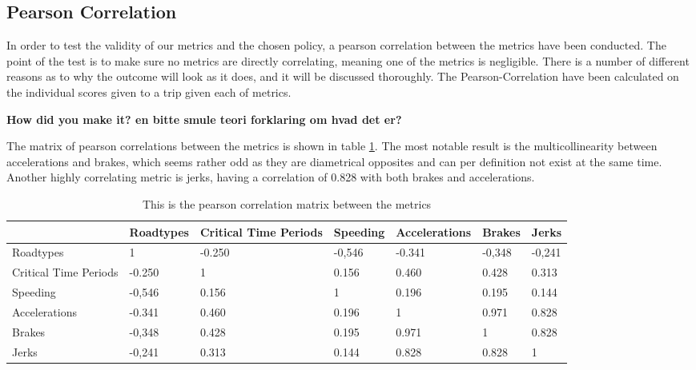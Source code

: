 \subsection{Pearson Correlation}\label{subsec:pearsoncorrelation}

In order to test the validity of our metrics and the chosen policy, a pearson correlation between the metrics have been conducted. The point of the test is to make sure no metrics are directly correlating, meaning one of the metrics is negligible. There is a number of different reasons as to why the outcome will look as it does, and it will be discussed thoroughly. The Pearson-Correlation have been calculated on the individual scores given to a trip given each of metrics. 

\textbf{How did you make it? en bitte smule teori forklaring om hvad det er?}

The matrix of pearson correlations between the metrics is shown in table \ref{tab:pearsonmatrix}. The most notable result is the multicollinearity between accelerations and brakes, which seems rather odd as they are diametrical opposites and can per definition not exist at the same time. Another highly correlating metric is jerks, having a correlation of 0.828 with both brakes and accelerations. 

\begin{table}[tb]
\centering
\caption{This is the pearson correlation matrix between the metrics}
\label{tab:pearsonmatrix}
\begin{tabular}{l|llllll}
                      & Roadtypes & Critical Time Periods & Speeding & Accelerations & Brakes & Jerks  \\ \hline
Roadtypes             & 1         & -0.250                & -0,546   & -0.341        & -0,348 & -0,241 \\
Critical Time Periods & -0.250    & 1                     & 0.156    & 0.460         & 0.428  & 0.313  \\
Speeding              & -0,546    & 0.156                 & 1        & 0.196         & 0.195  & 0.144  \\
Accelerations         & -0.341    & 0.460                 & 0.196    & 1             & 0.971  & 0.828  \\
Brakes                & -0,348    & 0.428                 & 0.195    & 0.971         & 1      & 0.828  \\
Jerks                 & -0,241    & 0.313                 & 0.144    & 0.828         & 0.828  & 1     
\end{tabular}
\end{table}

